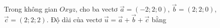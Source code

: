\begin{ex}
Trong không gian $Oxyz$, cho ba vectơ $\vec a=(-2;2;0)$, $\vec b=(2;2;0)$, $\vec c=(2;2;2)$. Độ dài của vectơ $\vec u=\vec a+\vec b+\vec c$ bằng
\end{ex}

